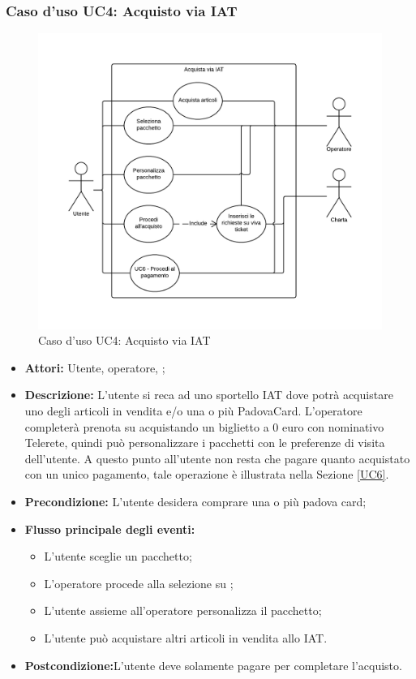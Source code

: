 \subsubsection{Caso d'uso UC4: Acquisto via IAT}\label{UC4}
\begin{figure}[H]
\centering
\includegraphics[width=1\textwidth]{images/UC4.png}
\caption{Caso d'uso UC4: Acquisto via IAT}
\end{figure}
\begin{itemize}
\item \textbf{Attori:} Utente, operatore, \charta;
\item \textbf{Descrizione:} L'utente si reca ad uno sportello IAT dove potrà acquistare uno degli articoli in vendita e/o una o più PadovaCard. L'operatore completerà prenota su \tlite acquistando un biglietto a 0 euro con nominativo Telerete, quindi può personalizzare i pacchetti con le preferenze di visita  dell'utente. A questo punto all'utente non resta che pagare quanto acquistato con un unico pagamento, tale operazione è illustrata nella Sezione \ref{UC6}.
\item \textbf{Precondizione:} L'utente desidera comprare una o più padova card;
\item \textbf{Flusso principale degli eventi:}
	\begin{itemize}
    	\item L'utente sceglie un pacchetto;
        \item L'operatore procede alla selezione su \tlite;
		\item L'utente assieme all'operatore personalizza il pacchetto;
		\item L'utente può acquistare altri articoli in vendita allo IAT.
	\end{itemize}
\item \textbf{Postcondizione:}L'utente deve solamente pagare per completare l'acquisto.
\end{itemize}


